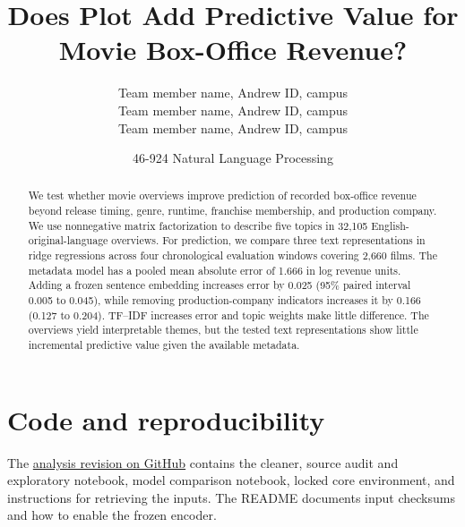 \documentclass[12pt]{article}
\title{Does Plot Add Predictive Value for Movie Box-Office Revenue?}
\author{Team member name, Andrew ID, campus \\
Team member name, Andrew ID, campus \\
Team member name, Andrew ID, campus}
\date{46-924 Natural Language Processing}
\begin{document}
\maketitle

\begin{abstract}
We test whether movie overviews improve prediction of recorded box-office
revenue beyond release timing, genre, runtime, franchise membership, and
production company. We use nonnegative matrix factorization to describe five
topics in 32,105 English-original-language overviews. For prediction, we compare
three text representations in ridge regressions across four chronological
evaluation windows covering 2,660 films. The metadata model has a pooled mean
absolute error of 1.666 in log revenue units. Adding a frozen sentence embedding
increases error by 0.025 (95\% paired interval 0.005 to 0.045), while removing
production-company indicators increases it by 0.166 (0.127 to 0.204). TF--IDF
increases error and topic weights make little difference. The overviews yield
interpretable themes, but the tested text representations show little incremental
predictive value given the available metadata.
\end{abstract}









\clearpage
\appendix
\section{Code and reproducibility}
The \href{https://github.com/samaypanwar/nlp-movie-revenue/tree/e5ba6ae63a1e630a5ab811d29787b2787da08af1}{analysis revision on GitHub}
contains the cleaner, source audit and exploratory notebook, model comparison
notebook, locked core environment, and instructions for retrieving the inputs.
The README documents input checksums and how to enable the frozen encoder.
\end{document}
